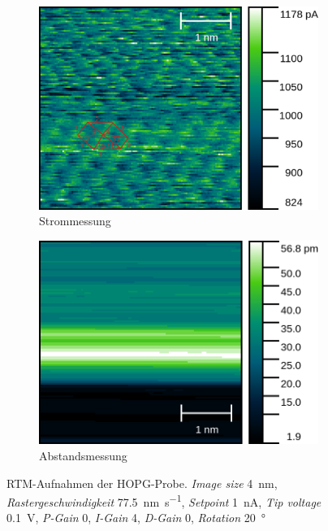 \begin{figure}
	\centering
	\begin{subfigure}{0.45\linewidth}
		\centering
		\includegraphics[width=\linewidth]{figs/HOPG10597_lines.png}
		\caption{Strommessung}
		\label{fig:hopg_rtm_4nm_1_cur}
	\end{subfigure}
	\hspace{.5cm}
	\begin{subfigure}{0.45\linewidth}
		\centering
		\includegraphics[width=\linewidth]{figs/HOPG10597_height.png}
		\caption{Abstandsmessung}
		\label{fig:hopg_rtm_4nm_1_height}
	\end{subfigure}
	\caption{RTM-Aufnahmen der HOPG-Probe. \textit{Image size} \SI{4}{\nano \meter},
	\textit{Rastergeschwindigkeit} \SI{77.5}{\nm\per \second}, \textit{Setpoint} \SI{1}{\nano \ampere},
	\textit{Tip voltage} \SI{0.1}{\volt}, \textit{P-Gain} \num{0}, \textit{I-Gain} \num{4},
	\textit{D-Gain} \num{0}, \textit{Rotation} \SI{20}{\degree}}
	\label{fig:hopg_rtm_1}
\end{figure}

